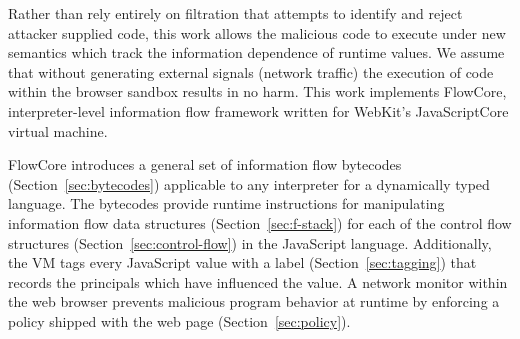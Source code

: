 \begin{comment}
\todo{categorize XSS?}

\begin{itemize}
    \item say that js handles sensitive info
    \item delineate injection
    \item categorize xss
    \item pound-include problem
    \item scare-monger prevalence as `buffer overflow'
    \item sandbox + same origin policy
    \item have to setup an attacker model?
\end{itemize}

\end{comment}

Rather than rely entirely on filtration that attempts to identify and reject attacker supplied code, this work allows the malicious code to execute under new semantics which track the information dependence of runtime values.
We assume that without generating external signals (network traffic) the execution of code within the browser sandbox results in no harm.
This work implements FlowCore, interpreter-level information flow framework written for WebKit's JavaScriptCore virtual machine.

FlowCore introduces a general set of information flow bytecodes (Section~\ref{sec:bytecodes}) applicable to any interpreter for a dynamically typed language.
The bytecodes provide runtime instructions for manipulating information flow data structures (Section~\ref{sec:f-stack}) for each of the control flow structures (Section~\ref{sec:control-flow}) in the JavaScript language.
Additionally, the VM tags every JavaScript value with a label (Section~\ref{sec:tagging}) that records the principals which have influenced the value.
A network monitor within the web browser prevents malicious program behavior at runtime by enforcing a policy shipped with the web page (Section~\ref{sec:policy}).

\begin{comment}
on using information flow techniques which can detect and prevent malicious behavior of executing programs.

- change language semantics
- augment memory model with labels
- detect and intercept xss
- prevent information leakage

Combine earlier approaches into a universal and comprehensive framework
- decentralized labeling
- support more flexible policies
- hybrid static/dynamic analysis
- dynamically track information flow
- pervasively works at the lowest layer
\end{comment}
